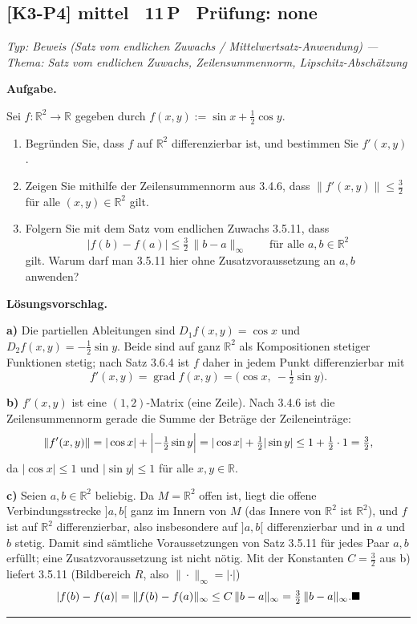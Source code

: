 \documentclass[a4paper,11pt]{article}
\providecommand{\qed}{\hfill\ensuremath{\blacksquare}}
\begin{document}
\subsection*{[K3-P4] \normalfont mittel \textbullet\ 11\,P \textbullet\ Pr\"ufung: none}
\textit{Typ: Beweis (Satz vom endlichen Zuwachs / Mittelwertsatz-Anwendung)  ---  Thema: Satz vom endlichen Zuwachs, Zeilensummennorm, Lipschitz-Abschätzung}\par\smallskip
\textbf{Aufgabe.}\par
Sei $f:\mathbb{R}^2\to\mathbb{R}$ gegeben durch $f(x,y):=\sin x+\tfrac12\cos y$.
\begin{enumerate}[label=\alph*)]
\item Begr\"unden Sie, dass $f$ auf $\mathbb{R}^2$ differenzierbar ist, und bestimmen Sie $f'(x,y)$.
\item Zeigen Sie mithilfe der Zeilensummennorm aus 3.4.6, dass $\|f'(x,y)\|\le \tfrac32$ f\"ur alle $(x,y)\in\mathbb{R}^2$ gilt.
\item Folgern Sie mit dem Satz vom endlichen Zuwachs 3.5.11, dass
\[
|f(b)-f(a)|\le \tfrac32\,\|b-a\|_\infty\qquad\text{f\"ur alle }a,b\in\mathbb{R}^2
\]
gilt. Warum darf man 3.5.11 hier ohne Zusatzvoraussetzung an $a,b$ anwenden?
\end{enumerate}\par\smallskip
\textbf{L\"osungsvorschlag.}\par
\textbf{a)} Die partiellen Ableitungen sind $D_1f(x,y)=\cos x$ und $D_2f(x,y)=-\tfrac12\sin y$. Beide sind auf ganz $\mathbb{R}^2$ als Kompositionen stetiger Funktionen stetig; nach Satz 3.6.4 ist $f$ daher in jedem Punkt differenzierbar mit
\[
f'(x,y)=\operatorname{grad} f(x,y)=\bigl(\cos x,\ -\tfrac12\sin y\bigr).
\]

\textbf{b)} $f'(x,y)$ ist eine $(1,2)$-Matrix (eine Zeile). Nach 3.4.6 ist die Zeilensummennorm gerade die Summe der Betr\"age der Zeileneintr\"age:
\[
\|f'(x,y)\|=|\cos x|+\Bigl|-\tfrac12\sin y\Bigr|=|\cos x|+\tfrac12|\sin y|\le 1+\tfrac12\cdot1=\tfrac32 ,
\]
da $|\cos x|\le1$ und $|\sin y|\le1$ f\"ur alle $x,y\in\mathbb{R}$.

\textbf{c)} Seien $a,b\in\mathbb{R}^2$ beliebig. Da $M=\mathbb{R}^2$ offen ist, liegt die offene Verbindungsstrecke $]a,b[$ ganz im Innern von $M$ (das Innere von $\mathbb{R}^2$ ist $\mathbb{R}^2$), und $f$ ist auf $\mathbb{R}^2$ differenzierbar, also insbesondere auf $]a,b[$ differenzierbar und in $a$ und $b$ stetig. Damit sind s\"amtliche Voraussetzungen von Satz 3.5.11 f\"ur jedes Paar $a,b$ erf\"ullt; eine Zusatzvoraussetzung ist nicht n\"otig. Mit der Konstanten $C=\tfrac32$ aus b) liefert 3.5.11 (Bildbereich $R$, also $\|\cdot\|_\infty=|\cdot|$)
\[
|f(b)-f(a)|=\|f(b)-f(a)\|_\infty\le C\,\|b-a\|_\infty=\tfrac32\,\|b-a\|_\infty . \qed
\]\par\bigskip\hrule\bigskip
\end{document}
